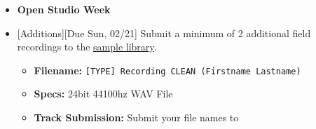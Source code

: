 \def\dMon{Mon, 02/15}
\def\dTues{Tues, 02/16}
\def\dWed{Wed, 02/17}
\def\dThur{Thur, 02/18}
\def\dFri{Fri, 02/19}
\def\dSat{Sat, 02/20}
\def\dSun{Sun, 02/21}
\placeDate

\begin{itemize}[noitemsep,topsep=0pt,leftmargin=*]
        \item \textcolor{defaultColor}{\textbf{Open Studio Week}}
        \item {}[Additions][Due \dSun] \newline 
 Submit a minimum of 2 additional field recordings to the \href{\#}{sample library}.
        \begin{itemize}
                \item \textbf{Filename:} \texttt{[TYPE] Recording CLEAN (Firstname Lastname)}
                \item \textbf{Specs:} 24bit 44100hz WAV File
                \item \textbf{Track Submission:} Submit your file names to \discordS
        \end{itemize}
\end{itemize}
